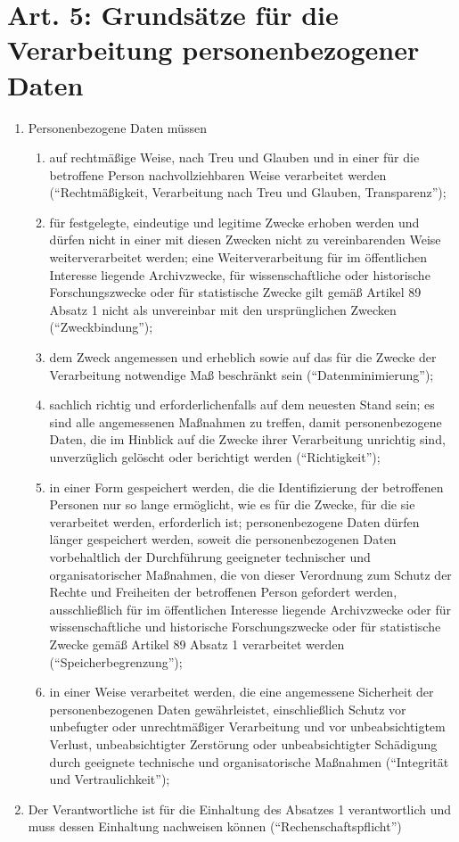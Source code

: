 \documentclass[A4, 12pt]{scrbook}
\begin{document}
    \section{Art. 5: Grundsätze für die Verarbeitung personenbezogener Daten}
        \begin{enumerate}[label=(\arabic*)]
            \item Personenbezogene Daten müssen
                \begin{enumerate}[label=\alph*)]
                    \item auf rechtmäßige Weise, nach Treu und Glauben und in einer für die betroffene Person nachvollziehbaren Weise verarbeitet werden (``Rechtmäßigkeit, Verarbeitung nach Treu und Glauben, Transparenz'');
                    \item für festgelegte, eindeutige und legitime Zwecke erhoben werden und dürfen nicht in einer mit diesen Zwecken nicht zu vereinbarenden Weise weiterverarbeitet werden; eine Weiterverarbeitung für im öffentlichen Interesse liegende Archivzwecke, für wissenschaftliche oder historische Forschungszwecke oder für statistische Zwecke gilt gemäß Artikel 89 Absatz 1 nicht als unvereinbar mit den ursprünglichen Zwecken (``Zweckbindung'');
                    \item dem Zweck angemessen und erheblich sowie auf das für die Zwecke der Verarbeitung notwendige Maß beschränkt sein (``Datenminimierung''); 
                    \item sachlich richtig und erforderlichenfalls auf dem neuesten Stand sein; es sind alle angemessenen Maßnahmen zu treffen, damit personenbezogene Daten, die im Hinblick auf die Zwecke ihrer Verarbeitung unrichtig sind, unverzüglich gelöscht oder berichtigt werden (``Richtigkeit'');
                    \item in einer Form gespeichert werden, die die Identifizierung der betroffenen Personen nur so lange ermöglicht, wie es für die Zwecke, für die sie verarbeitet werden, erforderlich ist; personenbezogene Daten dürfen länger gespeichert werden, soweit die personenbezogenen Daten vorbehaltlich der Durchführung geeigneter technischer und organisatorischer Maßnahmen, die von dieser Verordnung zum Schutz der Rechte und Freiheiten der betroffenen Person gefordert werden, ausschließlich für im öffentlichen Interesse liegende Archivzwecke oder für wissenschaftliche und historische Forschungszwecke oder für statistische Zwecke gemäß Artikel 89 Absatz 1 verarbeitet werden (``Speicherbegrenzung'');
                    \item in einer Weise verarbeitet werden, die eine angemessene Sicherheit der personenbezogenen Daten gewährleistet, einschließlich Schutz vor unbefugter oder unrechtmäßiger Verarbeitung und vor unbeabsichtigtem Verlust, unbeabsichtigter Zerstörung oder unbeabsichtigter Schädigung durch geeignete technische und organisatorische Maßnahmen (``Integrität und Vertraulichkeit'');
                \end{enumerate}
            \item Der Verantwortliche ist für die Einhaltung des Absatzes 1 verantwortlich und muss dessen Einhaltung nachweisen können (``Rechenschaftspflicht'')
        \end{enumerate}
\end{document}
